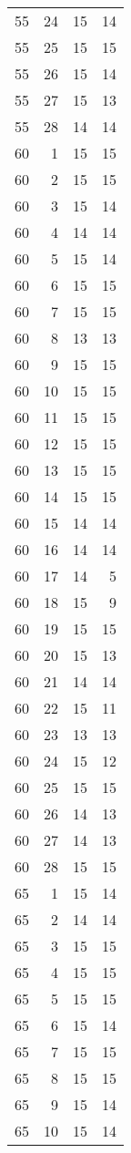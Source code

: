 \documentclass[
]{article}
\begin{document}
\begin{longtable}[]{@{}rrrr@{}}
55 & 24 & 15 & 14 \\
55 & 25 & 15 & 15 \\
55 & 26 & 15 & 14 \\
55 & 27 & 15 & 13 \\
55 & 28 & 14 & 14 \\
60 & 1 & 15 & 15 \\
60 & 2 & 15 & 15 \\
60 & 3 & 15 & 14 \\
60 & 4 & 14 & 14 \\
60 & 5 & 15 & 14 \\
60 & 6 & 15 & 15 \\
60 & 7 & 15 & 15 \\
60 & 8 & 13 & 13 \\
60 & 9 & 15 & 15 \\
60 & 10 & 15 & 15 \\
60 & 11 & 15 & 15 \\
60 & 12 & 15 & 15 \\
60 & 13 & 15 & 15 \\
60 & 14 & 15 & 15 \\
60 & 15 & 14 & 14 \\
60 & 16 & 14 & 14 \\
60 & 17 & 14 & 5 \\
60 & 18 & 15 & 9 \\
60 & 19 & 15 & 15 \\
60 & 20 & 15 & 13 \\
60 & 21 & 14 & 14 \\
60 & 22 & 15 & 11 \\
60 & 23 & 13 & 13 \\
60 & 24 & 15 & 12 \\
60 & 25 & 15 & 15 \\
60 & 26 & 14 & 13 \\
60 & 27 & 14 & 13 \\
60 & 28 & 15 & 15 \\
65 & 1 & 15 & 14 \\
65 & 2 & 14 & 14 \\
65 & 3 & 15 & 15 \\
65 & 4 & 15 & 15 \\
65 & 5 & 15 & 15 \\
65 & 6 & 15 & 14 \\
65 & 7 & 15 & 15 \\
65 & 8 & 15 & 15 \\
65 & 9 & 15 & 14 \\
65 & 10 & 15 & 14 \\

\end{longtable}
\end{document}
